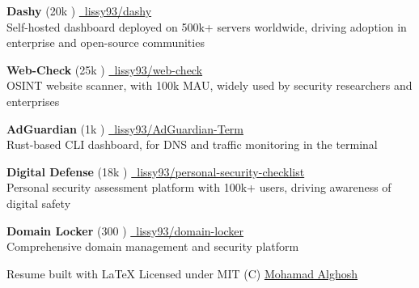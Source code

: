 \documentclass[]{resume-format}
\begin{document}
\vspace{0.5mm}
\begin{cvachievements}
  \setlength{\itemsep}{0mm}
  \item {\hspace{-5pt}
    \textbf{ Dashy } (20k \raisebox{0.5pt}{\scriptsize\faStar}) \href{ https://dashy.to }{\scriptsize\color{lightgray}\faLink} \hfill \href{https://github.com/lissy93/dashy}{\hspace{1pt}\faGithub\ lissy93/dashy}\\
    Self-hosted dashboard deployed on 500k+ servers worldwide, driving adoption in enterprise and open-source communities
  }
  \item {\hspace{-5pt}
    \textbf{ Web-Check } (25k \raisebox{0.5pt}{\scriptsize\faStar}) \href{ https://web-check.xyz }{\scriptsize\color{lightgray}\faLink} \hfill \href{https://github.com/lissy93/web-check}{\hspace{1pt}\faGithub\ lissy93/web-check}\\
    OSINT website scanner, with 100k MAU, widely used by security researchers and enterprises
  }
  \item {\hspace{-5pt}
    \textbf{ AdGuardian } (1k \raisebox{0.5pt}{\scriptsize\faStar}) \href{ https://adguardian.as93.net/ }{\scriptsize\color{lightgray}\faLink} \hfill \href{https://github.com/lissy93/AdGuardian-Term}{\hspace{1pt}\faGithub\ lissy93/AdGuardian-Term}\\
    Rust-based CLI dashboard, for DNS and traffic monitoring in the terminal
  }
  \item {\hspace{-5pt}
    \textbf{ Digital Defense } (18k \raisebox{0.5pt}{\scriptsize\faStar}) \href{ https://digital-defense.io/ }{\scriptsize\color{lightgray}\faLink} \hfill \href{https://github.com/lissy93/personal-security-checklist}{\hspace{1pt}\faGithub\ lissy93/personal-security-checklist}\\
    Personal security assessment platform with 100k+ users, driving awareness of digital safety
  }
  \item {\hspace{-5pt}
    \textbf{ Domain Locker } (300 \raisebox{0.5pt}{\scriptsize\faStar}) \href{ https://domain-locker.com/ }{\scriptsize\color{lightgray}\faLink} \hfill \href{https://github.com/lissy93/domain-locker}{\hspace{1pt}\faGithub\ lissy93/domain-locker}\\
    Comprehensive domain management and security platform
  }
\end{cvachievements}



\vspace{5mm}
\begin{center}
    \tiny\color{lightgray}
    Resume built with LaTeX
    Licensed under MIT (C)
    \href{https://www.alghosh.website}{ Mohamad Alghosh } {\the\year}
\end{center}
\ 
\end{document}
